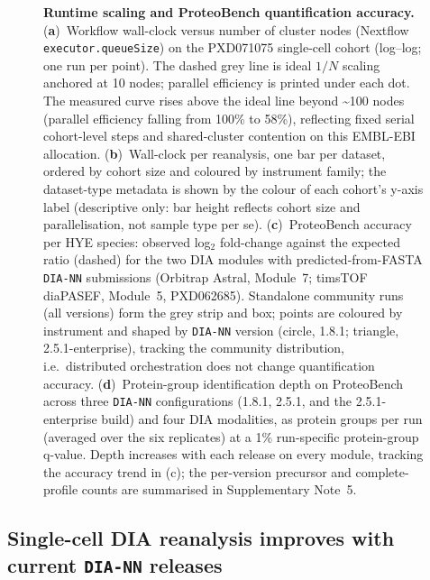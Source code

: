 \documentclass[preprint,12pt]{elsarticle}
\begin{document}
\begin{figure}[htbp]
  \centering
  \caption[Scaling and ProteoBench accuracy]{%
    \textbf{Runtime scaling and ProteoBench quantification accuracy.}
    (\textbf{a})~Workflow wall-clock versus number of cluster nodes (Nextflow
    \texttt{executor.queueSize}) on the PXD071075 single-cell cohort (log--log;
    one run per point). The dashed grey line is ideal $1{/}N$ scaling anchored at
    10 nodes; parallel efficiency is printed under each dot. The measured curve
    rises above the ideal line beyond \textasciitilde 100 nodes (parallel
    efficiency falling from 100\% to 58\%), reflecting fixed serial cohort-level
    steps and shared-cluster contention on this EMBL-EBI allocation.
    (\textbf{b})~Wall-clock per reanalysis, one bar per dataset, ordered by cohort
    size and coloured by instrument family; the dataset-type metadata is shown by
    the colour of each cohort's y-axis label (descriptive only: bar height reflects
    cohort size and parallelisation, not sample type per se).
    (\textbf{c})~ProteoBench accuracy per HYE species: observed log$_2$ fold-change
    against the expected ratio (dashed) for the two DIA modules with
    predicted-from-FASTA \texttt{DIA-NN} submissions (Orbitrap Astral, Module~7;
    timsTOF diaPASEF, Module~5, PXD062685). Standalone community runs (all versions) form
    the grey strip and box; \quantmsdiann{} points are coloured by instrument and
    shaped by \texttt{DIA-NN} version (circle, 1.8.1; triangle, 2.5.1-enterprise),
    tracking the community distribution, i.e.\ distributed orchestration does not
    change quantification accuracy.
    (\textbf{d})~Protein-group identification depth on ProteoBench across three
    \texttt{DIA-NN} configurations (1.8.1, 2.5.1, and the 2.5.1-enterprise build)
    and four DIA modalities, as protein groups per run (averaged over the six
    replicates) at a 1\% run-specific protein-group q-value. Depth increases with
    each release on every module, tracking the accuracy trend in (c); the
    per-version precursor and complete-profile counts are summarised in
    Supplementary Note~5.
  }
  \label{fig:validation}
\end{figure}

\subsection{Single-cell DIA reanalysis improves with current \texttt{DIA-NN} releases}
\label{sec:single-cell}
\end{document}
